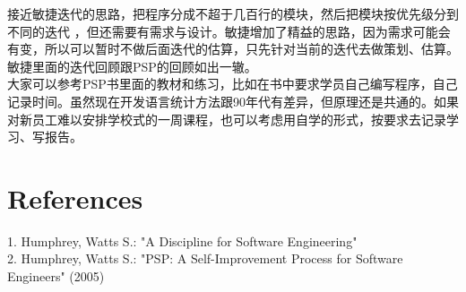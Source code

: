 接近敏捷迭代的思路，把程序分成不超于几百行的模块，然后把模块按优先级分到不同的迭代
，但还需要有需求与设计。敏捷增加了精益的思路，因为需求可能会有变，所以可以暂时不做后面迭代的估算，只先针对当前的迭代去做策划、估算。
敏捷里面的迭代回顾跟PSP的回顾如出一辙。\\
大家可以参考PSP书里面的教材和练习，比如在书中要求学员自己编写程序，自己记录时间。虽然现在开发语言统计方法跟90年代有差异，但原理还是共通的。如果对新员工难以安排学校式的一周课程，也可以考虑用自学的形式，按要求去记录学习、写报告。


\hypertarget{references}{%
\section{References}\label{references}}

1. Humphrey, Watts S.: "A Discipline for Software Engineering"\\
2. Humphrey, Watts S.: "PSP: A Self-Improvement Process for Software
Engineers" (2005)\\


